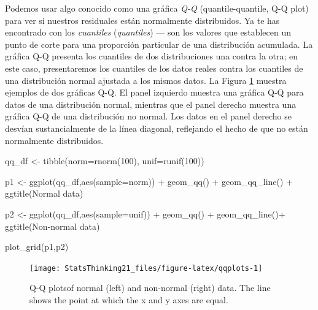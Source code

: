 \documentclass[
  12pt,
]{book}
\newenvironment{Shaded}{\begin{snugshade}}{\end{snugshade}}
\newcommand{\AttributeTok}[1]{\textcolor[rgb]{0.77,0.63,0.00}{#1}}
\newcommand{\DecValTok}[1]{\textcolor[rgb]{0.00,0.00,0.81}{#1}}
\newcommand{\FunctionTok}[1]{\textcolor[rgb]{0.00,0.00,0.00}{#1}}
\newcommand{\NormalTok}[1]{#1}
\newcommand{\OtherTok}[1]{\textcolor[rgb]{0.56,0.35,0.01}{#1}}
\newcommand{\SpecialCharTok}[1]{\textcolor[rgb]{0.00,0.00,0.00}{#1}}
\newcommand{\StringTok}[1]{\textcolor[rgb]{0.31,0.60,0.02}{#1}}
\begin{document}
Podemos usar algo conocido como una gráfica \emph{Q-Q} (quantile-quantile, Q-Q plot) para ver si nuestros residuales están normalmente distribuidos. Ya te has encontrado con los \emph{cuantiles} (\emph{quantiles}) --- son los valores que establecen un punto de corte para una proporción particular de una distribución acumulada. La gráfica Q-Q presenta los cuantiles de dos distribuciones una contra la otra; en este caso, presentaremos los cuantiles de los datos reales contra los cuantiles de una distribución normal ajustada a los mismos datos. La Figura \ref{fig:qqplots} muestra ejemplos de dos gráficas Q-Q. El panel izquierdo muestra una gráfica Q-Q para datos de una distribución normal, mientras que el panel derecho muestra una gráfica Q-Q de una distribución no normal. Los datos en el panel derecho se desvían sustancialmente de la línea diagonal, reflejando el hecho de que no están normalmente distribuidos.

\begin{Shaded}
\begin{Highlighting}[]
\NormalTok{qq\_df }\OtherTok{\textless{}{-}} \FunctionTok{tibble}\NormalTok{(}\AttributeTok{norm=}\FunctionTok{rnorm}\NormalTok{(}\DecValTok{100}\NormalTok{),}
                \AttributeTok{unif=}\FunctionTok{runif}\NormalTok{(}\DecValTok{100}\NormalTok{))}

\NormalTok{p1 }\OtherTok{\textless{}{-}} \FunctionTok{ggplot}\NormalTok{(qq\_df,}\FunctionTok{aes}\NormalTok{(}\AttributeTok{sample=}\NormalTok{norm)) }\SpecialCharTok{+} 
  \FunctionTok{geom\_qq}\NormalTok{() }\SpecialCharTok{+} 
  \FunctionTok{geom\_qq\_line}\NormalTok{() }\SpecialCharTok{+} 
  \FunctionTok{ggtitle}\NormalTok{(}\StringTok{\textquotesingle{}Normal data\textquotesingle{}}\NormalTok{)}

\NormalTok{p2 }\OtherTok{\textless{}{-}} \FunctionTok{ggplot}\NormalTok{(qq\_df,}\FunctionTok{aes}\NormalTok{(}\AttributeTok{sample=}\NormalTok{unif)) }\SpecialCharTok{+} 
  \FunctionTok{geom\_qq}\NormalTok{() }\SpecialCharTok{+} 
  \FunctionTok{geom\_qq\_line}\NormalTok{()}\SpecialCharTok{+} 
  \FunctionTok{ggtitle}\NormalTok{(}\StringTok{\textquotesingle{}Non{-}normal data\textquotesingle{}}\NormalTok{)}

\FunctionTok{plot\_grid}\NormalTok{(p1,p2)}
\end{Highlighting}
\end{Shaded}

\begin{figure}
\texttt{[image: StatsThinking21\_files/figure-latex/qqplots-1]} \caption{Q-Q plotsof normal (left) and non-normal (right) data.  The line shows the point at which the x and y axes are equal.}\label{fig:qqplots}
\end{figure}
\end{document}
